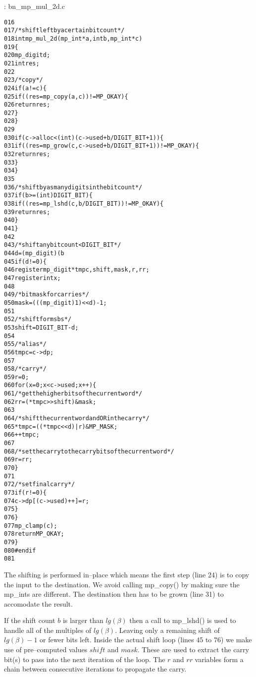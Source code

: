 \documentclass[b5paper]{book}
\begin{document}
\vspace{+3mm}\begin{small}
\hspace{-5.1mm}{\bf File}: bn\_mp\_mul\_2d.c
\vspace{-3mm}
\begin{alltt}
016   
017   /* shift left by a certain bit count */
018   int mp_mul_2d (mp_int * a, int b, mp_int * c)
019   \{
020     mp_digit d;
021     int      res;
022   
023     /* copy */
024     if (a != c) \{
025        if ((res = mp_copy (a, c)) != MP_OKAY) \{
026          return res;
027        \}
028     \}
029   
030     if (c->alloc < (int)(c->used + b/DIGIT_BIT + 1)) \{
031        if ((res = mp_grow (c, c->used + b / DIGIT_BIT + 1)) != MP_OKAY) \{
032          return res;
033        \}
034     \}
035   
036     /* shift by as many digits in the bit count */
037     if (b >= (int)DIGIT_BIT) \{
038       if ((res = mp_lshd (c, b / DIGIT_BIT)) != MP_OKAY) \{
039         return res;
040       \}
041     \}
042   
043     /* shift any bit count < DIGIT_BIT */
044     d = (mp_digit) (b % DIGIT_BIT);
045     if (d != 0) \{
046       register mp_digit *tmpc, shift, mask, r, rr;
047       register int x;
048   
049       /* bitmask for carries */
050       mask = (((mp_digit)1) << d) - 1;
051   
052       /* shift for msbs */
053       shift = DIGIT_BIT - d;
054   
055       /* alias */
056       tmpc = c->dp;
057   
058       /* carry */
059       r    = 0;
060       for (x = 0; x < c->used; x++) \{
061         /* get the higher bits of the current word */
062         rr = (*tmpc >> shift) & mask;
063   
064         /* shift the current word and OR in the carry */
065         *tmpc = ((*tmpc << d) | r) & MP_MASK;
066         ++tmpc;
067   
068         /* set the carry to the carry bits of the current word */
069         r = rr;
070       \}
071       
072       /* set final carry */
073       if (r != 0) \{
074          c->dp[(c->used)++] = r;
075       \}
076     \}
077     mp_clamp (c);
078     return MP_OKAY;
079   \}
080   #endif
081   
\end{alltt}
\end{small}

The shifting is performed in--place which means the first step (line 24) is to copy the input to the 
destination.  We avoid calling mp\_copy() by making sure the mp\_ints are different.  The destination then
has to be grown (line 31) to accomodate the result.

If the shift count $b$ is larger than $lg(\beta)$ then a call to mp\_lshd() is used to handle all of the multiples 
of $lg(\beta)$.  Leaving only a remaining shift of $lg(\beta) - 1$ or fewer bits left.  Inside the actual shift 
loop (lines 45 to 76) we make use of pre--computed values $shift$ and $mask$.   These are used to
extract the carry bit(s) to pass into the next iteration of the loop.  The $r$ and $rr$ variables form a 
chain between consecutive iterations to propagate the carry.  
\end{document}

